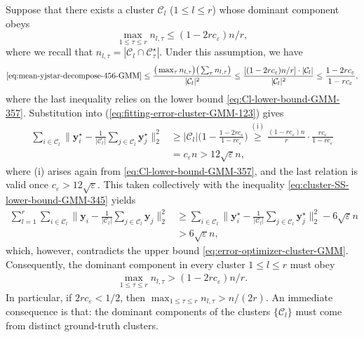 \bigskip
{}
%
Suppose that there exists a cluster $\mathcal{C}_{l}$ ($1\leq l\leq r$) whose dominant component obeys
%
\[
	\max_{1\leq\tau\leq r}n_{l,\tau}  \leq  (1-2rc_{\varepsilon})n/r,
\]
%
where we recall that $n_{l,\tau}=|\mathcal{C}_{l}\cap \mathcal{C}_{\tau}^{\star}|$.
Under this assumption, we have
%
\begin{align*}
	\eqref{eq:mean-yjstar-decompose-456-GMM}
	 \leq \frac{\big(\max_{\tau}n_{l,\tau}\big)\big( \sum_{\tau}n_{l,\tau}\big)}{|\mathcal{C}_{l}|^2}
	\leq \frac{[(1-2rc_{\varepsilon})n/r]\cdot |\mathcal{C}_l|}{|\mathcal{C}_{l}|^2}
	\leq \frac{1-2rc_{\varepsilon}}{1-rc_{\varepsilon}},
\end{align*}
%
where the last inequality relies on the lower bound \eqref{eq:Cl-lower-bound-GMM-357}.
Substitution into (\ref{eq:fitting-error-cluster-GMM-123}) gives
%
\begin{align*}
\sum_{i\in\mathcal{C}_{l}}\Big\|\bm{y}_{i}^{\star}-\frac{1}{|\mathcal{C}_{l}|}\sum_{j\in\mathcal{C}_{l}}\bm{y}_{j}^{\star}\Big\|_{2}^{2}
& \geq|\mathcal{C}_{l}| \Big(1-\frac{1-2rc_{\varepsilon}}{1-rc_{\varepsilon}}\Big)
\overset{\mathrm{(i)}}{\geq} \frac{(1-rc_{\varepsilon})n}{r} \cdot \frac{rc_{\varepsilon}}{1-rc_{\varepsilon}} \\
 & =c_{\varepsilon}n > 12\sqrt{\varepsilon}n,
\end{align*}
%
where (i) arises again from \eqref{eq:Cl-lower-bound-GMM-357},
and the last relation is valid once $c_{\varepsilon}> 12\sqrt{\varepsilon}$.
This taken collectively with the inequality \eqref{eq:cluster-SS-lower-bound-GMM-345} yields
%
\begin{align*}
\sum_{l=1}^{r}\sum_{i\in\mathcal{C}_{l}}\Big\|\bm{y}_{i}-\frac{1}{|\mathcal{C}_{l}|}\sum_{j\in\mathcal{C}_{l}}\bm{y}_{j}\Big\|_{2}^{2} & \geq\sum_{i\in\mathcal{C}_{l}}\Big\|\bm{y}_{i}^{\star}-\frac{1}{|\mathcal{C}_{l}|}\sum_{j\in\mathcal{C}_{l}}\bm{y}_{j}^{\star}\Big\|_{2}^{2}-6\sqrt{\varepsilon}n\\
 & > 6 \sqrt{\varepsilon}n,
\end{align*}
%
which, however, contradicts the upper bound \eqref{eq:error-optimizer-cluster-GMM}.
Consequently, the dominant component in every cluster $1\leq l\leq r$ must obey
%
\begin{align}
	\max_{1\leq\tau\leq r}n_{l,\tau}  >  (1-2rc_{\varepsilon})n/r.
	\label{eq:lower-bound-n-l-tau-GMM}
\end{align}
%
In particular, if $2rc_{\varepsilon}< 1/2$, then $\max_{1\leq\tau\leq r}n_{l,\tau} > n/(2r)$.
An immediate consequence is that: the dominant components of the clusters $\{\mathcal{C}_l\}$ must come from distinct ground-truth clusters.



